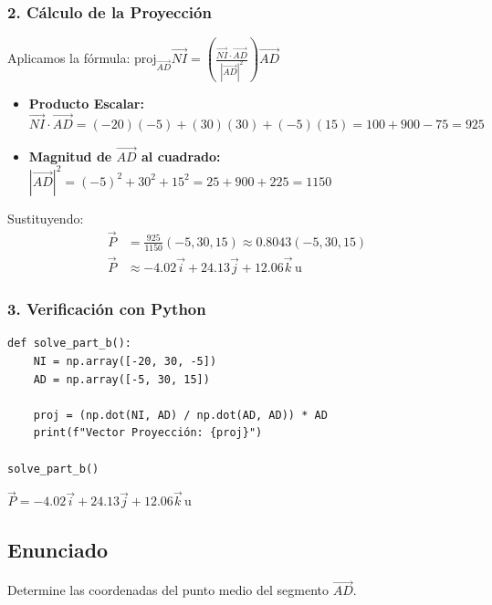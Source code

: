 \documentclass[12pt, a4paper]{article}
\begin{document}
\subsubsection*{2. Cálculo de la Proyección}
Aplicamos la fórmula: $\text{proj}_{\vec{AD}} \vec{NI} = \left( \frac{\vec{NI} \cdot \vec{AD}}{|\vec{AD}|^2} \right) \vec{AD}$

\begin{itemize}
    \item \textbf{Producto Escalar:} $\vec{NI} \cdot \vec{AD} = (-20)(-5) + (30)(30) + (-5)(15) = 100 + 900 - 75 = 925$
    \item \textbf{Magnitud de $\vec{AD}$ al cuadrado:} $|\vec{AD}|^2 = (-5)^2 + 30^2 + 15^2 = 25 + 900 + 225 = 1150$
\end{itemize}

Sustituyendo:
\begin{align*}
    \vec{P} &= \frac{925}{1150} (-5, 30, 15) \approx 0.8043 (-5, 30, 15) \\
    \vec{P} &\approx -4.02\vec{i} + 24.13\vec{j} + 12.06\vec{k} \, \text{u}
\end{align*}

\subsubsection*{3. Verificación con Python}
\begin{lstlisting}
def solve_part_b():
    NI = np.array([-20, 30, -5])
    AD = np.array([-5, 30, 15])
    
    proj = (np.dot(NI, AD) / np.dot(AD, AD)) * AD
    print(f"Vector Proyección: {proj}")

solve_part_b()
\end{lstlisting}

\begin{tcolorbox}[colback=green!5!white, colframe=green!50!black, title=Respuesta Final]
\centering \Large $\vec{P} = -4.02\vec{i} + 24.13\vec{j} + 12.06\vec{k} \, \text{u}$
\end{tcolorbox}

\newpage


\subsection*{Enunciado}
Determine las coordenadas del punto medio del segmento $\vec{AD}$.
\end{document}
